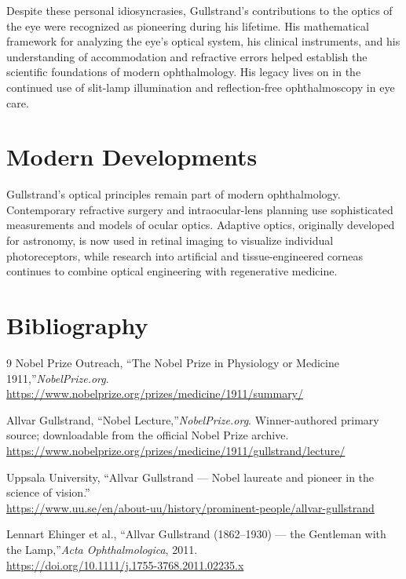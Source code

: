 Despite these personal idiosyncrasies, Gullstrand's contributions to the optics of the eye were recognized as pioneering during his lifetime. His mathematical framework for analyzing the eye's optical system, his clinical instruments, and his understanding of accommodation and refractive errors helped establish the scientific foundations of modern ophthalmology. His legacy lives on in the continued use of slit-lamp illumination and reflection-free ophthalmoscopy in eye care.


\section{Modern Developments}

Gullstrand's optical principles remain part of modern ophthalmology. Contemporary refractive surgery and intraocular-lens planning use sophisticated measurements and models of ocular optics. Adaptive optics, originally developed for astronomy, is now used in retinal imaging to visualize individual photoreceptors, while research into artificial and tissue-engineered corneas continues to combine optical engineering with regenerative medicine.


\section{Bibliography}

\begin{thebibliography}{9}
Nobel Prize Outreach, ``The Nobel Prize in Physiology or Medicine 1911,''\emph{NobelPrize.org}.\\
\url{https://www.nobelprize.org/prizes/medicine/1911/summary/}

Allvar Gullstrand, ``Nobel Lecture,''\emph{NobelPrize.org}. Winner-authored primary source; downloadable from the official Nobel Prize archive.\\
\url{https://www.nobelprize.org/prizes/medicine/1911/gullstrand/lecture/}

Uppsala University, ``Allvar Gullstrand --- Nobel laureate and pioneer in the science of vision.''\\
\url{https://www.uu.se/en/about-uu/history/prominent-people/allvar-gullstrand}

Lennart Ehinger et al., ``Allvar Gullstrand (1862--1930) --- the Gentleman with the Lamp,''\emph{Acta Ophthalmologica}, 2011.\\
\url{https://doi.org/10.1111/j.1755-3768.2011.02235.x}
\end{thebibliography}
